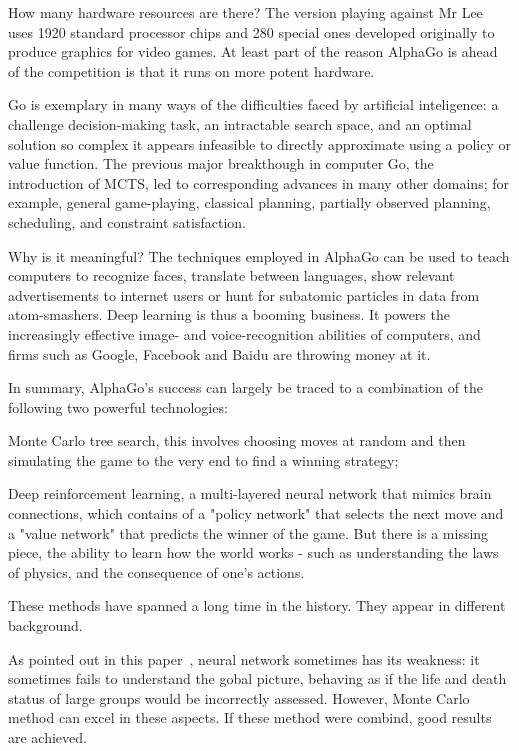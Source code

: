 How many hardware resources are there? The version playing against Mr Lee uses 1920 standard processor chips and 280 special ones developed originally to produce graphics for video games. At least part of the reason AlphaGo is ahead of the competition is that it runs on more potent hardware.

Go is exemplary in many ways of the difficulties faced by artificial inteligence: a challenge decision-making task, an intractable search space, and an optimal solution so complex it appears infeasible to directly approximate using a policy or value function. The previous major breakthough in computer Go, the introduction of MCTS, led to corresponding advances in many other domains; for example, general game-playing, classical planning, partially observed planning, scheduling, and constraint satisfaction.

Why is it meaningful? The techniques employed in AlphaGo can be used to teach computers to recognize faces, translate between languages, show relevant advertisements to internet users or hunt for subatomic particles in data from atom-smashers. Deep learning is thus a booming business. It powers the increasingly effective image- and voice-recognition abilities of computers, and firms such as Google, Facebook and Baidu are throwing money at it.

In summary, AlphaGo's success can largely be traced to a combination of the following two powerful technologies: 
\begin{inparaenum}
\item Monte Carlo tree search, this involves choosing moves at random and then simulating the game to the very end to find a winning strategy;
\item Deep reinforcement learning, a multi-layered neural network that mimics brain connections, which contains of a "policy network" that selects the next move and a "value network" that predicts the winner of the game. But there is a missing piece, the ability to learn how the world works - such as understanding the laws of physics, and the consequence of one's actions.
\end{inparaenum}
These methods have spanned a long time in the history. They appear in different background. 


As pointed out in this paper~\cite{maddison2014move}, neural network sometimes has its weakness: it sometimes fails to understand the gobal picture, behaving as if the life and death status of large groups would be incorrectly assessed. However, Monte Carlo method can excel in these aspects. If these method were combind, good results are achieved.

